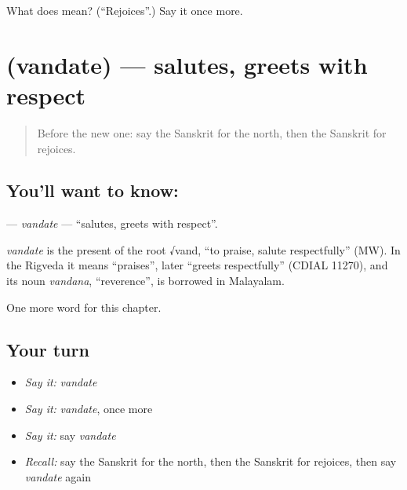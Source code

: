\begin{tcolorbox}[breakable,colback=teal!4,colframe=teal!35!black,title={Before you move on}]
What does  mean? (\textquotedblleft{}Rejoices\textquotedblright{}.) Say it once more.
\end{tcolorbox}
\section[\texorpdfstring{\sk{वन्दते} (vandate)}{वन्दते (vandate)}]{ (vandate) — salutes, greets with respect}

\label{lesson:SA-C203-vandate}



\begin{quote}
Before the new one: say the Sanskrit for the north, then the Sanskrit for rejoices.
\end{quote}

\subsection*{You'll want to know: }
\textbf{} — \emph{vandate} — \textquotedblleft{}salutes, greets with respect\textquotedblright{}.

\begin{cousinweb}
\emph{vandate} is the present of the root √vand, \textquotedblleft{}to praise, salute respectfully\textquotedblright{} (MW). In the Rigveda it means \textquotedblleft{}praises\textquotedblright{}, later \textquotedblleft{}greets respectfully\textquotedblright{} (CDIAL 11270), and its noun \emph{vandana}, \textquotedblleft{}reverence\textquotedblright{}, is borrowed in Malayalam.
\end{cousinweb}

\begin{grammarlens}[title={What you've built}]
One more word for this chapter.
\end{grammarlens}

\subsection*{Your turn}
\begin{itemize}
\raggedright
  \item \emph{Say it:} \emph{vandate}
  \item \emph{Say it:} \emph{vandate}, once more
  \item \emph{Say it:} say \emph{vandate}
  \item \emph{Recall:} say the Sanskrit for the north, then the Sanskrit for rejoices, then say \emph{vandate} again
\end{itemize}

